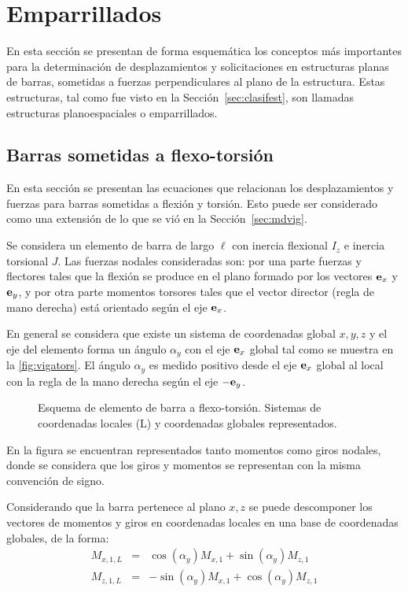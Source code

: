 \section{Emparrillados}

En esta sección se presentan de forma esquemática los conceptos más importantes para la determinación de desplazamientos y solicitaciones en estructuras planas de barras, sometidas a fuerzas perpendiculares al plano de la estructura. %
%
Estas estructuras, tal como fue visto en la Sección~\ref{sec:clasifest}, son llamadas estructuras planoespaciales o emparrillados.


\subsection{Barras sometidas a flexo-torsión}
%
En esta sección se presentan las ecuaciones que relacionan los desplazamientos y fuerzas para barras sometidas a flexión y torsión. %
%
Esto puede ser considerado como una extensión de lo que se vió en la Sección~\ref{sec:mdvig}. %

Se considera un elemento de barra de largo $\ell$ con inercia flexional $I_z$ e inercia torsional $J$. %
%
Las fuerzas nodales consideradas son: por una parte fuerzas y flectores tales que la flexión se produce en el plano formado por los vectores ${\bf e}_x$ y ${\bf e}_y$, y por otra parte momentos torsores tales que el vector director (regla de mano derecha) está orientado según el eje ${\bf e}_x$. %


En general se considera que existe un sistema de coordenadas global  $x,y,z$ y el eje del elemento forma un ángulo $\alpha_y$ con el eje ${\bf e}_x$ global tal como se muestra en la \autoref{fig:vigators}. %
El ángulo $\alpha_y$ es medido positivo desde el eje ${\bf e}_x$ global al local con la regla de la mano derecha según el eje $-{\bf e}_y$.


\begin{figure}[htb]
	\centering
  \def\svgwidth{1\textwidth}
  
  \caption{Esquema de elemento de barra a flexo-torsión. Sistemas de coordenadas locales (L) y coordenadas globales representados.}
  \label{fig:vigators}
\end{figure}


En la figura se encuentran representados tanto momentos como giros nodales, donde se considera que los giros y momentos se representan con la misma convención de signo. %
%

Considerando que la barra pertenece al plano $x,z$ se puede descomponer los vectores de momentos y giros en coordenadas locales en una base de coordenadas globales, de la forma:
%
\begin{eqnarray}
M_{x,1,L} &=& \cos(\alpha_y) M_{x,1} + \sin(\alpha_y) M_{z,1} \\
M_{z,1,L} &=& - \sin(\alpha_y) M_{x,1} + \cos(\alpha_y) M_{z,1}
\end{eqnarray}

